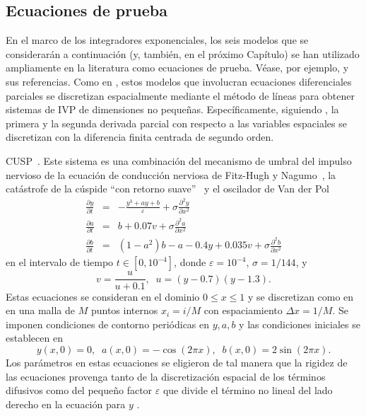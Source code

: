 \subsection{Ecuaciones de prueba}\label{section:test-eq}
En el marco de los integradores exponenciales, los seis modelos que se considerarán a continuación (y, también, en el próximo Capítulo) se han utilizado ampliamente en la literatura como ecuaciones de prueba. Véase, por ejemplo, \cite{tokman2006efficient,tokman2012new,tokman2013comparative} y sus referencias. Como en \cite{tokman2006efficient,tokman2012new,tokman2013comparative}, estos modelos que involucran ecuaciones diferenciales parciales se discretizan espacialmente mediante el método de líneas para obtener sistemas de IVP de dimensiones no pequeñas. Específicamente, siguiendo \cite{tokman2006efficient,tokman2012new,tokman2013comparative}, la primera y la segunda derivada parcial con respecto a las variables espaciales se discretizan con la diferencia finita centrada de segundo orden.

\begin{example}
    \label{ex:cusp} CUSP~\cite{wanner1996solving,tokman2006efficient}. Este sistema es una combinación del mecanismo de umbral del impulso nervioso de la ecuación de conducción nerviosa de Fitz-Hugh y Nagumo~\cite{fitzhugh1969mathematical,nagumo1962active}, la catástrofe de la cúspide ``con retorno suave''~\cite{zeeman1973differential} y el oscilador de Van der Pol
    \begin{eqnarray*}
        \frac{\partial y}{\partial t} &=& -\frac{y^{3}+ay+b}{\varepsilon}+\sigma\frac{\partial^{2}y}{\partial x^{2}}\\
        \frac{\partial a}{\partial t} &=& b+0\mathord{.}07v+\sigma \frac{\partial^{2}a}{\partial x^{2}}\\
        \frac{\partial b}{\partial t} &=& (1-a^{2})b-a-0\mathord{.}4y+0\mathord{.}035v+\sigma\frac{\partial^{2}b}{\partial x^{2}}
    \end{eqnarray*}
    en el intervalo de tiempo $t\in [0,10^{-4}]$, donde $\varepsilon=10^{-4}$, $\sigma=1/144$, y
    \[ v= \frac{u}{u+0\mathord{.}1},\;\; u=(y-0\mathord{.}7)(y-1\mathord{.}3).\]
    Estas ecuaciones se consideran en el dominio $0\leq x\leq 1$ y se discretizan como en \cite{tokman2006efficient} en una malla de $M$ puntos internos $x_i = i/M$ con espaciamiento $\Delta x=1/M$. Se imponen condiciones de contorno periódicas en $y,a,b$ y las condiciones iniciales se establecen en
    \[y(x, 0)=0,\;\;a(x, 0)=-\cos(2\pi x),\;\;b(x, 0)=2\sin(2\pi x).\]
    Los parámetros en estas ecuaciones se eligieron de tal manera que la rigidez de las ecuaciones provenga tanto de la discretización espacial de los términos difusivos como del pequeño factor $\varepsilon$ que divide el término no lineal del lado derecho en la ecuación para $y$ .
\end{example}


